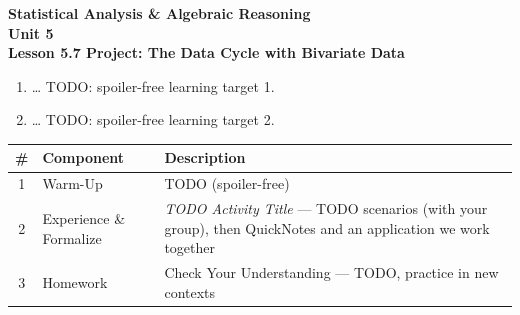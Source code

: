 \documentclass[10pt]{article}
\begin{document}
\vspace{-0.8in}

\begin{center}
  {\color{white}\textbf{\LARGE Statistical Analysis \& Algebraic Reasoning}}\\[4pt]
  {\color{frostmid}\large\textbf{Unit 5}}\\[6pt]
  {\color{white}\textbf{\large Lesson 5.7 \quad Project: The Data Cycle with Bivariate Data}}
\end{center}

\vspace{0.22in}
\namedateperiod
\vspace{0.18in}

\begin{learningtargetbox}
\small
\begin{enumerate}[leftmargin=1.5em, itemsep=5pt]
  \item \ldots{} TODO: spoiler-free learning target 1.
  \item \ldots{} TODO: spoiler-free learning target 2.
\end{enumerate}
\end{learningtargetbox}

\vspace{0.14in}

\begin{tocbox}
\small
\renewcommand{\arraystretch}{1.5}
\begin{tabularx}{\linewidth}{@{} c l X @{}}
\rowcolor{frost}
\textbf{\#} & \textbf{Component} & \textbf{Description} \\
\midrule
1 & Warm-Up    & TODO (spoiler-free) \\
2 & Experience \& Formalize & \emph{TODO Activity Title} --- TODO scenarios (with your group),
                 then QuickNotes and an application we work together \\
3 & Homework   & Check Your Understanding --- TODO, practice in new contexts \\
\end{tabularx}
\end{tocbox}
\end{document}
